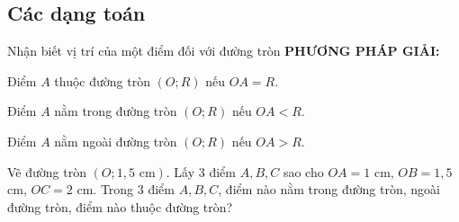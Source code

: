 \subsection{Các dạng toán}
\begin{dang}{Nhận biết vị trí của một điểm đối với đường tròn}
	\textbf{PHƯƠNG PHÁP GIẢI:}
	\begin{list}{•}{}
		\item Điểm $A$ thuộc đường tròn $(O;R)$ nếu $OA=R$.
		\item Điểm $A$ nằm trong đường tròn $(O;R)$ nếu $OA<R$.
		\item Điểm $A$ nằm ngoài đường tròn $(O;R)$ nếu $OA>R$.
	\end{list}
\end{dang}
\begin{vd}%
	Vẽ đường tròn $(O;1{,}5\text{ cm})$. Lấy $3$ điểm $A,B,C$ sao cho $OA=1$ cm, $OB=1{,}5$ cm, $OC=2$ cm. Trong $3$ điểm $A,B,C$, điểm nào nằm trong đường tròn, ngoài đường tròn, điểm nào thuộc đường tròn?
\end{vd}
